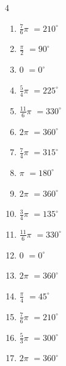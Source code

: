 \begin{multicols}{4}
\begin{enumerate}
  \item $\displaystyle \frac{7}{6}\pi$
        $\displaystyle =210^{\circ}$

  \item $\displaystyle \frac{\pi}{2}$
        $\displaystyle =90^{\circ}$

  \item $\displaystyle 0$
        $\displaystyle =0^{\circ}$

  \item $\displaystyle \frac{5}{4}\pi$
        $\displaystyle =225^{\circ}$

  \item $\displaystyle \frac{11}{6}\pi$
        $\displaystyle =330^{\circ}$

  \item $\displaystyle 2\pi$
        $\displaystyle =360^{\circ}$

  \item $\displaystyle \frac{7}{4}\pi$
        $\displaystyle =315^{\circ}$

  \item $\displaystyle \pi$
        $\displaystyle =180^{\circ}$

  \item $\displaystyle 2\pi$
        $\displaystyle =360^{\circ}$

  \item $\displaystyle \frac{3}{4}\pi$
        $\displaystyle =135^{\circ}$

  \item $\displaystyle \frac{11}{6}\pi$
        $\displaystyle =330^{\circ}$

  \item $\displaystyle 0$
        $\displaystyle =0^{\circ}$

\columnbreak %

  \item $\displaystyle 2\pi$
        $\displaystyle =360^{\circ}$

  \item $\displaystyle \frac{\pi}{4}$
        $\displaystyle =45^{\circ}$

  \item $\displaystyle \frac{7}{6}\pi$
        $\displaystyle =210^{\circ}$

  \item $\displaystyle \frac{5}{3}\pi$
        $\displaystyle =300^{\circ}$

  \item $\displaystyle 2\pi$
        $\displaystyle =360^{\circ}$


\end{enumerate}
\end{multicols}
